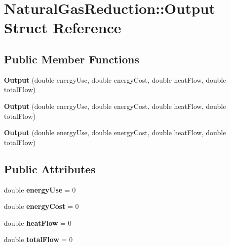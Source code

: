 \hypertarget{struct_natural_gas_reduction_1_1_output}{}\section{Natural\+Gas\+Reduction\+:\+:Output Struct Reference}
\label{struct_natural_gas_reduction_1_1_output}
\subsection*{Public Member Functions}
\begin{DoxyCompactItemize}
\item 
\mbox{\label{struct_natural_gas_reduction_1_1_output_a30c340a35b058e97119ca2f3c937c2bc}} 
{\bfseries Output} (double energy\+Use, double energy\+Cost, double heat\+Flow, double total\+Flow)
\item 
\mbox{\label{struct_natural_gas_reduction_1_1_output_a30c340a35b058e97119ca2f3c937c2bc}} 
{\bfseries Output} (double energy\+Use, double energy\+Cost, double heat\+Flow, double total\+Flow)
\item 
\mbox{\label{struct_natural_gas_reduction_1_1_output_a30c340a35b058e97119ca2f3c937c2bc}} 
{\bfseries Output} (double energy\+Use, double energy\+Cost, double heat\+Flow, double total\+Flow)
\end{DoxyCompactItemize}
\subsection*{Public Attributes}
\begin{DoxyCompactItemize}
\item 
\mbox{\label{struct_natural_gas_reduction_1_1_output_a96e4bb57892801a41a54b8af859b890c}} 
double {\bfseries energy\+Use} = 0
\item 
\mbox{\label{struct_natural_gas_reduction_1_1_output_a78c635b987327e2f9ac9516cd4165934}} 
double {\bfseries energy\+Cost} = 0
\item 
\mbox{\label{struct_natural_gas_reduction_1_1_output_aa9a6b165ff9f0d30fbff29f0ad133865}} 
double {\bfseries heat\+Flow} = 0
\item 
\mbox{\label{struct_natural_gas_reduction_1_1_output_aa1ce963b3196d38b54c9063f56e3d1d3}} 
double {\bfseries total\+Flow} = 0
\end{DoxyCompactItemize}


